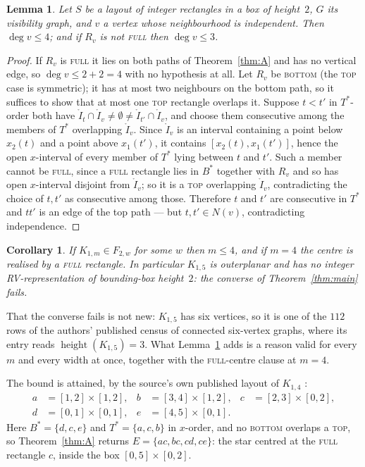 \documentclass[11pt]{amsart}
\newtheorem{lemma}[theorem]{Lemma}
\newtheorem{corollary}[theorem]{Corollary}
\theoremstyle{remark}
\newcommand{\Bs}{B^{*}}
\newcommand{\Ts}{T^{*}}
\newcommand{\height}{\operatorname{height}}
\begin{document}
\begin{lemma}\label{lem:star}
Let $S$ be a layout of integer rectangles in a box of height~$2$, $G$ its visibility
graph, and $v$ a vertex whose neighbourhood is independent. Then $\deg v\le4$; and if
$R_v$ is not \textsc{full} then $\deg v\le3$.
\end{lemma}

\begin{proof}
If $R_v$ is \textsc{full} it lies on both paths of Theorem~\ref{thm:A} and has no
vertical edge, so $\deg v\le 2+2=4$ with no hypothesis at all. Let $R_v$ be
\textsc{bottom} (the \textsc{top} case is symmetric); it has at most two neighbours on
the bottom path, so it suffices to show that at most one \textsc{top} rectangle overlaps
it. Suppose $t<t'$ in $\Ts$-order both have $\mathring I_t\cap\mathring
I_v\neq\emptyset\neq\mathring I_{t'}\cap\mathring I_v$, and choose them consecutive
among the members of $\Ts$ overlapping $\mathring I_v$. Since $\mathring I_v$ is an
interval containing a point below $x_2(t)$ and a point above $x_1(t')$, it contains
$[x_2(t),x_1(t')]$, hence the open $x$-interval of every member of $\Ts$ lying between
$t$ and $t'$. Such a member cannot be \textsc{full}, since a \textsc{full} rectangle
lies in $\Bs$ together with $R_v$ and so has open $x$-interval disjoint from $\mathring
I_v$; so it is a \textsc{top} overlapping $\mathring I_v$, contradicting the choice of
$t,t'$ as consecutive among those. Therefore $t$ and $t'$ are consecutive in $\Ts$ and
$tt'$ is an edge of the top path --- but $t,t'\in N(v)$, contradicting independence.
\end{proof}

\begin{corollary}\label{cor:conv}
If $K_{1,m}\in F_{2,w}$ for some $w$ then $m\le4$, and if $m=4$ the centre is realised
by a \textsc{full} rectangle. In particular $K_{1,5}$ is outerplanar and has no integer
RV-representation of bounding-box height~$2$: the converse of
Theorem~\ref{thm:main} fails.
\end{corollary}

That the converse fails is not new: $K_{1,5}$ has six vertices, so it is one of the
$112$ rows of the authors' published census \cite{WebList} of connected six-vertex
graphs, where its entry reads $\height(K_{1,5})=3$. What Lemma~\ref{lem:star} adds is a
reason valid for every $m$ and every width at once, together with the
\textsc{full}-centre clause at $m=4$.

The bound is attained, by the source's own published layout of $K_{1,4}$
\cite{CDLNS23}:
\begin{equation}\label{eq:k14}
\begin{aligned}
 a&=[1,2]\times[1,2], & b&=[3,4]\times[1,2], & c&=[2,3]\times[0,2],\\
 d&=[0,1]\times[0,1], & e&=[4,5]\times[0,1].
\end{aligned}
\end{equation}
Here $\Bs=\{d,c,e\}$ and $\Ts=\{a,c,b\}$ in $x$-order, and no \textsc{bottom} overlaps a
\textsc{top}, so Theorem~\ref{thm:A} returns $E=\{ac,bc,cd,ce\}$: the star centred at
the \textsc{full} rectangle $c$, inside the box $[0,5]\times[0,2]$.
\end{document}
